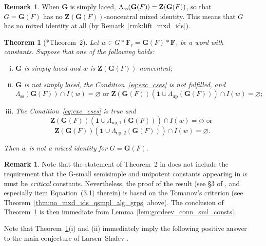 \documentclass[a4paper,12pt]{amsproc}
\theoremstyle{plain}
\newtheorem{theorem}[definition]{Theorem}
\theoremstyle{definition}
\newtheorem{remark}[definition]{Remark}
\begin{document}
\begin{remark}\label{rmk:smply_lced}
When $\mathbf{G}$ is simply laced, $\Lambda_{\rm ss}(\mathbf{G}(F))=\mathbf{Z}(\mathbf{G}(F))$, so that $G=\mathbf{G}(F)$ has no $\mathbf{Z}(\mathbf{G}(F))$-noncentral mixed identity. This means that $\overline{G}$ has no mixed identity at all (by Remark~\ref{rmk:lift_mxd_ids}).
\end{remark}
	
\begin{theorem}[\cite{gordeev1997freedom}*{Theorem~2}]\label{thm:gordeev_crit_consts}
Let $w\in G\ast\mathbf{F}_r=\mathbf{G}(F)\ast\mathbf{F}_r$ be a word with constants. Suppose that one of the following holds:
\begin{enumerate}[(i)]
\item $\mathbf{G}$ is simply laced and $w$ is $\mathbf{Z}(\mathbf{G}(F))$-noncentral;
\item $\mathbf{G}$ is not simply laced, the Condition~\eqref{eq:exc_cses} is not fulfilled, and 
$$
\Lambda_{\text{ss}}(\mathbf{G}(F))\cap I(w)=\varnothing\text{ or }\mathbf{Z}(\mathbf{G}(F))(\mathbf{1}\cup\Lambda_{\text{up}}(\mathbf{G}(F)))\cap I(w)=\varnothing;
$$
\item The Condition~\eqref{eq:exc_cses} is true and 
$$
\mathbf{Z}(\mathbf{G}(F))(\mathbf{1}\cup\Lambda_{\text{up},1}(\mathbf{G}(F)))\cap I(w)=\varnothing\text{ or }
$$ 
$$
\mathbf{Z}(\mathbf{G}(F))(\mathbf{1}\cup\Lambda_{\text{up},2}(\mathbf{G}(F)))\cap I(w)=\varnothing. 
$$
\end{enumerate}
Then $w$ is not a mixed identity for $G=\mathbf{G}(F)$.
\end{theorem}

\begin{remark}
Note that the statement of Theorem~2 in \cite{gordeev1997freedom} does not include 
the requirement that the G-small semisimple and unipotent constants appearing in $w$ must 
be \emph{critical} constants. Nevertheless, 
the proof of the result (see \S3 of \cite{gordeev1997freedom}, and especially item Equation~(3.1) therein) 
is based on the Tomanov's criterion (see Theorem~\ref{thm:no_mxd_ids_qsmpl_alg_grps} above). 
The conclusion of Theorem~\ref{thm:gordeev_crit_consts} 
is then immediate from Lemma~\ref{lem:gordeev_conn_sml_consts}.
\end{remark}

Note that Theorem~\ref{thm:gordeev_crit_consts}(i) and (ii) immediately imply the following positive answer to the main conjecture of Larsen--Shalev \cite{larsenshalev2022identities}.
\end{document}
